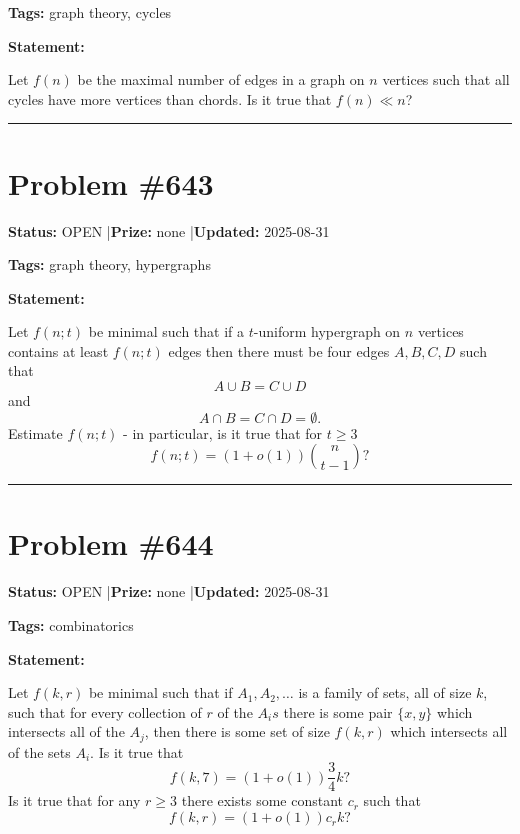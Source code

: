 \documentclass{article}
\begin{document}
\noindent\textbf{Tags:} graph theory, cycles

\medskip

\noindent\textbf{Statement:}

Let $f(n)$ be the maximal number of edges in a graph on $n$ vertices such that all cycles have more vertices than chords. Is it true that $f(n)\ll n$?

\noindent\rule{\linewidth}{0.4pt}


\section{Problem \#643}
\label{prob:643}

\noindent\textbf{Status:} OPEN \quad|\quad \textbf{Prize:} none \quad|\quad \textbf{Updated:} 2025-08-31

\noindent\textbf{Tags:} graph theory, hypergraphs

\medskip

\noindent\textbf{Statement:}

Let $f(n;t)$ be minimal such that if a $t$-uniform hypergraph on $n$ vertices contains at least $f(n;t)$ edges then there must be four edges $A,B,C,D$ such that\[A\cup B= C\cup D\]and\[A\cap B=C\cap D=\emptyset.\]Estimate $f(n;t)$ - in particular, is it true that for $t\geq 3$\[f(n;t)=(1+o(1))\binom{n}{t-1}?\]

\noindent\rule{\linewidth}{0.4pt}


\section{Problem \#644}
\label{prob:644}

\noindent\textbf{Status:} OPEN \quad|\quad \textbf{Prize:} none \quad|\quad \textbf{Updated:} 2025-08-31

\noindent\textbf{Tags:} combinatorics

\medskip

\noindent\textbf{Statement:}

Let $f(k,r)$ be minimal such that if $A_1,A_2,\ldots$ is a family of sets, all of size $k$, such that for every collection of $r$ of the $A_is$ there is some pair $\{x,y\}$ which intersects all of the $A_j$, then there is some set of size $f(k,r)$ which intersects all of the sets $A_i$. Is it true that\[f(k,7)=(1+o(1))\frac{3}{4}k?\]Is it true that for any $r\geq 3$ there exists some constant $c_r$ such that\[f(k,r)=(1+o(1))c_rk?\]
\end{document}
